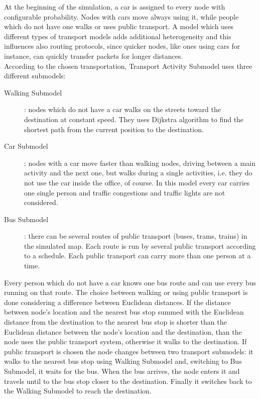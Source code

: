 At the beginning of the simulation, a car is assigned to every node with configurable probability. Nodes with cars move always using it, while people which do not have one walks or uses public transport. A model which uses different types of transport models adds additional heterogeneity and this influences also routing protocols, since quicker nodes, like ones using cars for instance, can quickly transfer packets for longer distances.
\\

According to the chosen transportation, Transport Activity Submodel uses three different submodels:
\\

\begin{description}
\item [Walking Submodel]: nodes which do not have a car walks on the streets toward the destination at constant speed. They uses Dijkstra algorithm to find the shortest path from the current position to the destination.

\item [Car Submodel]: nodes with a car move faster than walking nodes, driving between a main activity and the next one, but walks during a single activities, i.e. they do not use the car inside the office, of course. In this model every car carries one single person and traffic congestions and traffic lights are not considered.

\item [Bus Submodel]: there can be several routes of public transport (buses, trams, trains) in the simulated map. Each route is run by several public transport according to a schedule. Each public transport can carry more than one person at a time.
\end{description}

Every person which do not have a car knows one bus route and can use every bus running on that route. The choice between walking or using public transport is done considering a difference between Euclidean distances. If the distance between node's location and the nearest bus stop summed with the Euclidean distance from the destination to the nearest bus stop is shorter than the Euclidean distance between the node's location and the destination, than the node uses the public transport system, otherwise it walks to the destination. If public transport is chosen the node changes between two transport submodels: it walks to the nearest bus stop using Walking Submodel and, switching to Bus Submodel, it waits for the bus. When the bus arrives, the node enters it and travels until to the bus stop closer to the destination. Finally it switches back to the Walking Submodel to reach the destination.
 

